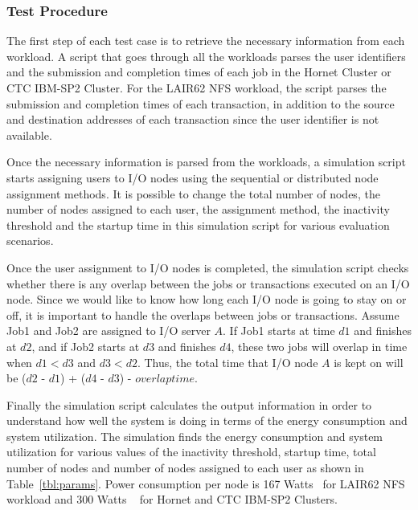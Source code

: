 \subsubsection{Test Procedure}
The first step of each test case is to retrieve the necessary information from each workload. A script
that goes through all the workloads parses the user identifiers and the submission and completion times
of each job in the Hornet Cluster or CTC IBM-SP2 Cluster. For the LAIR62 NFS workload, the script
parses the submission and completion times of each transaction, in addition to the source and
destination addresses of each transaction since the user identifier is not available.

Once the necessary information is parsed from the workloads, a simulation script starts assigning users
to I/O nodes using the sequential or distributed node assignment methods. It is possible to change the
total number of nodes, the number of nodes assigned to each user, the assignment method, the inactivity
threshold and the startup time in this simulation script for various evaluation scenarios.

Once the user assignment to I/O nodes is completed, the simulation script checks whether there is
any overlap between the jobs or transactions executed on an I/O node. Since we would like to know how
long each I/O node is going to stay on or off, it is important to handle the overlaps between jobs or
transactions. Assume Job1 and Job2 are assigned to I/O server $A$. If Job1 starts at time $d1$ and finishes
at $d2$, and if Job2 starts at $d3$ and finishes $d4$, these two jobs will overlap in time when $d1 < d3$
and $d3 < d2$. Thus, the total time that I/O node $A$ is kept on will be ($d2$ - $d1$) + ($d4$ - $d3$)
- $overlap time$.

Finally the simulation script calculates the output information in order to understand how well the
system is doing in terms of the energy consumption and system utilization. The simulation finds the
energy consumption and system utilization for various values of the inactivity threshold, startup time,
total number of nodes and number of nodes assigned to each user as shown in Table~\ref{tbl:params}.
Power consumption per node is 167 Watts~\cite{knightshift} for LAIR62 NFS workload and 300 Watts
~\cite{DBLP:journals/computer/BianchiniR04} for Hornet and CTC IBM-SP2 Clusters.


